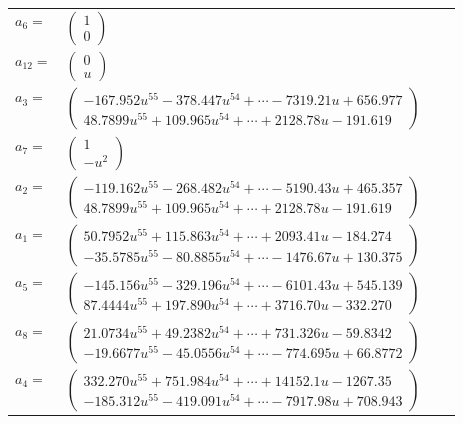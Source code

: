 \documentclass[1p]{elsarticle_modified}
\theoremstyle{definition}
\begin{document}
\begin{tabular}{m{7pt} m{180pt} m{7pt} m{180pt} }
\flushright $a_{6}=$&$\begin{pmatrix}1\\0\end{pmatrix}$ \\
\flushright $a_{12}=$&$\begin{pmatrix}0\\u\end{pmatrix}$ \\
\flushright $a_{3}=$&$\begin{pmatrix}-167.952 u^{55}-378.447 u^{54}+\cdots-7319.21 u+656.977\\48.7899 u^{55}+109.965 u^{54}+\cdots+2128.78 u-191.619\end{pmatrix}$ \\
\flushright $a_{7}=$&$\begin{pmatrix}1\\- u^2\end{pmatrix}$ \\
\flushright $a_{2}=$&$\begin{pmatrix}-119.162 u^{55}-268.482 u^{54}+\cdots-5190.43 u+465.357\\48.7899 u^{55}+109.965 u^{54}+\cdots+2128.78 u-191.619\end{pmatrix}$ \\
\flushright $a_{1}=$&$\begin{pmatrix}50.7952 u^{55}+115.863 u^{54}+\cdots+2093.41 u-184.274\\-35.5785 u^{55}-80.8855 u^{54}+\cdots-1476.67 u+130.375\end{pmatrix}$ \\
\flushright $a_{5}=$&$\begin{pmatrix}-145.156 u^{55}-329.196 u^{54}+\cdots-6101.43 u+545.139\\87.4444 u^{55}+197.890 u^{54}+\cdots+3716.70 u-332.270\end{pmatrix}$ \\
\flushright $a_{8}=$&$\begin{pmatrix}21.0734 u^{55}+49.2382 u^{54}+\cdots+731.326 u-59.8342\\-19.6677 u^{55}-45.0556 u^{54}+\cdots-774.695 u+66.8772\end{pmatrix}$ \\
\flushright $a_{4}=$&$\begin{pmatrix}332.270 u^{55}+751.984 u^{54}+\cdots+14152.1 u-1267.35\\-185.312 u^{55}-419.091 u^{54}+\cdots-7917.98 u+708.943\end{pmatrix}$ \\

\end{tabular}
\end{document}
